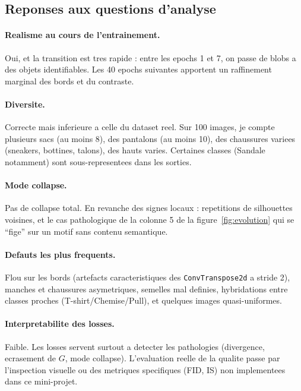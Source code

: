 \documentclass[11pt,a4paper]{article}
\begin{document}
\subsection{Reponses aux questions d'analyse}

\paragraph{Realisme au cours de l'entrainement.} Oui, et la transition est tres rapide : entre les epochs 1 et 7, on passe de blobs a des objets identifiables. Les 40 epochs suivantes apportent un raffinement marginal des bords et du contraste.

\paragraph{Diversite.} Correcte mais inferieure a celle du dataset reel. Sur 100 images, je compte plusieurs sacs (au moins 8), des pantalons (au moins 10), des chaussures variees (sneakers, bottines, talons), des hauts varies. Certaines classes (Sandale notamment) sont sous-representees dans les sorties.

\paragraph{Mode collapse.} Pas de collapse total. En revanche des signes locaux : repetitions de silhouettes voisines, et le cas pathologique de la colonne 5 de la figure~\ref{fig:evolution} qui se ``fige'' sur un motif sans contenu semantique.

\paragraph{Defauts les plus frequents.} Flou sur les bords (artefacts caracteristiques des \texttt{ConvTranspose2d} a stride 2), manches et chaussures asymetriques, semelles mal definies, hybridations entre classes proches (T-shirt/Chemise/Pull), et quelques images quasi-uniformes.

\paragraph{Interpretabilite des losses.} Faible. Les losses servent surtout a detecter les pathologies (divergence, ecrasement de $G$, mode collapse). L'evaluation reelle de la qualite passe par l'inspection visuelle ou des metriques specifiques (FID, IS) non implementees dans ce mini-projet.
\end{document}
